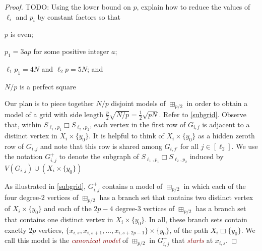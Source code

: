\documentclass[kpfonts,lotsofwhite]{patmorin}
\newcommand{\defn}[1]{\textcolor{Maroon}{\emph{#1}}}
\newcommand{\boxprod}{\mathbin{\Box}}
\renewcommand{\ge}{\geqslant}
\newcommand{\PP}{\mathcal{P}}
\theoremstyle{plain}
\theoremstyle{definition}
\begin{document}
\begin{proof}
  TODO: Using the lower bound on $p$, explain how to reduce the values of $\ell_i$ and $p_i$ by constant factors so that
   \begin{compactenum}
     \item $p$ is even;
     \item $p_1 = 3ap$ for some positive integer $a$;
     \item $\ell_1p_1 = 4N$ and $\ell_2 p=5N$; and
     \item $N/p$ is a perfect square
   \end{compactenum}


  Our plan is to piece together $N/p$ disjoint models of $\boxplus_{p/2}$ in order to obtain a model of a grid with side length $\tfrac{p}{2}\sqrt{N/p}=\tfrac{1}{2}\sqrt{pN}$.  Refer to \cref{subgrid}.  Observe that, within $S_{\ell_1,p_1}\boxprod S_{\ell_2,p_2}$, each vertex in the first row of $G_{i,j}$ is adjacent to a distinct vertex in $X_i\times\{y_0\}$. It is helpful to think of $X_i\times\{y_0\}$ as a hidden zeroth row of $G_{i,j}$ and note that this row is shared among $G_{i,j'}$ for all $j\in[\ell_2]$.  We use the notation $G_{i,j}^+$ to denote the subgraph of $S_{\ell_1,p_1}\boxprod S_{\ell_2,p_2}$ induced by $V(G_{i,j})\cup (X_i\times\{y_0\})$

  As illustrated in \cref{subgrid}, $G_{i,j}^+$ contains a model of $\boxplus_{p/2}$ in which each of the four degree-$2$ vertices of $\boxplus_{p/2}$ has a branch set that contains two distinct vertex of $X_i\times\{y_0\}$ and each of the $2p-4$ degree-$3$ vertices of $\boxplus_{p/2}$ has a branch set that contains one distinct vertex in $X_i\times\{y_0\}$.  In all, these branch sets contain exactly $2p$ vertices, $\{x_{i,s},x_{i,s+1},\ldots,x_{i,s+2p-1}\}\times\{y_0\}$, of the path $X_i\boxprod\{y_0\}$. We call this model is the \defn{canonical model} of $\boxplus_{p/2}$ in $G_{i,j}^+$ that \defn{starts} at $x_{i,s}$.


\end{proof}
\end{document}
